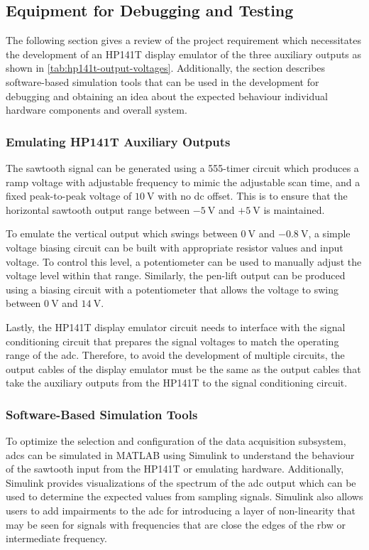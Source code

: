 \documentclass[class=report,11pt,crop=false]{standalone}
\begin{document}
	\subsection{Equipment for Debugging and Testing}
	
	The following section gives a review of the project requirement which necessitates the development of an HP141T display emulator of the three auxiliary outputs as shown in \ref{tab:hp141t-output-voltages}. Additionally, the section describes software-based simulation tools that can be used in the development for debugging and obtaining an idea about the expected behaviour individual hardware components and overall system.
	
	\subsubsection{Emulating HP141T Auxiliary Outputs}
	
	The sawtooth signal can be generated using a 555-timer circuit which produces a ramp voltage with adjustable frequency to mimic the adjustable scan time, and a fixed peak-to-peak voltage of $\SI{10}{\volt}$ with no \acrshort{dc} offset. This is to ensure that the horizontal sawtooth output range between $-\SI{5}{\volt}$ and $+\SI{5}{\volt}$ is maintained. 
	
	To emulate the vertical output which swings between $\SI{0}{\volt}$ and $-\SI{0.8}{\volt}$, a simple voltage biasing circuit can be built with appropriate resistor values and input voltage. To control this level, a potentiometer can be used to manually adjust the voltage level within that range. Similarly, the pen-lift output can be produced using a biasing circuit with a potentiometer that allows the voltage to swing between $\SI{0}{\volt}$ and $\SI{14}{\volt}$. 
	
	Lastly, the HP141T display emulator circuit needs to interface with the signal conditioning circuit that prepares the signal voltages to match the operating range of the \acrshort{adc}. Therefore, to avoid the development of multiple circuits, the output cables of the display emulator must be the same as the output cables that take the auxiliary outputs from the HP141T to the signal conditioning circuit.
	
	\subsubsection{Software-Based Simulation Tools}
	
	To optimize the selection and configuration of the data acquisition subsystem, \acrshort{adc}s can be simulated in MATLAB using Simulink to understand the behaviour of the sawtooth input from the HP141T or emulating hardware. Additionally, Simulink provides visualizations of the spectrum of the \acrshort{adc} output which can be used to determine the expected values from sampling signals. Simulink also allows users to add impairments to the \acrshort{adc} for introducing a layer of non-linearity that may be seen for signals with frequencies that are close the edges of the \acrshort{rbw} or intermediate frequency. 
	
\end{document}
